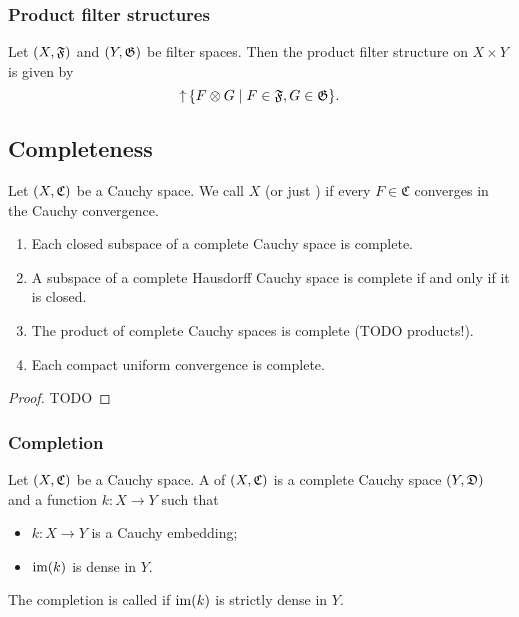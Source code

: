 \subsubsection{Product filter structures}
\begin{lemma}
Let $\sSet{X, \mathfrak{F}}$ and $\sSet{Y, \mathfrak{G}}$ be filter spaces. Then the product filter structure on $X\times Y$ is given by
\[ \upset \setbuilder{F\otimes G}{F\in \mathfrak{F}, G\in \mathfrak{G}}. \]
\end{lemma}

\subsection{Completeness}
\begin{definition}
Let $\sSet{X, \mathfrak{C}}$ be a Cauchy space. We call $X$  (or just ) if every $F\in \mathfrak{C}$ converges in the Cauchy convergence.
\end{definition}

\begin{proposition}
\begin{enumerate}
\item Each closed subspace of a complete Cauchy space is complete.
\item A subspace of a complete Hausdorff Cauchy space is complete \textup{if and only if} it is closed.
\item The product of complete Cauchy spaces is complete (TODO products!).
\item Each compact uniform convergence is complete.
\end{enumerate}
\end{proposition}
\begin{proof}
TODO
\end{proof}

\subsubsection{Completion}
\begin{definition}
Let $\sSet{X, \mathfrak{C}}$ be a Cauchy space. A  of $\sSet{X, \mathfrak{C}}$ is a complete Cauchy space $\sSet{Y, \mathfrak{D}}$ and a function $k: X\to Y$ such that
\begin{itemize}
\item $k: X\to Y$ is a Cauchy embedding;
\item $\operatorname{im}(k)$ is dense in $Y$.
\end{itemize}
The completion is called  if $\operatorname{im}(k)$ is strictly dense in $Y$.
\end{definition}

